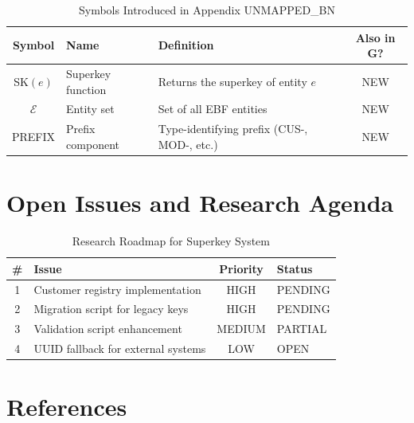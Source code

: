 \begin{table}[htbp]
\centering
\caption{Symbols Introduced in Appendix UNMAPPED_BN}
\label{tab:superkey-symbols}
\renewcommand{\arraystretch}{1.3}
\begin{tabular}{@{}clp{6cm}c@{}}
\toprule
\textbf{Symbol} & \textbf{Name} & \textbf{Definition} & \textbf{Also in G?} \\
\midrule
SK$(e)$ & Superkey function & Returns the superkey of entity $e$ & NEW \\
$\mathcal{E}$ & Entity set & Set of all EBF entities & NEW \\
PREFIX & Prefix component & Type-identifying prefix (CUS-, MOD-, etc.) & NEW \\
\bottomrule
\end{tabular}
\end{table}


\section{Open Issues and Research Agenda}
\label{sec:superkey-open}

\begin{table}[htbp]
\centering
\caption{Research Roadmap for Superkey System}
\label{tab:superkey-roadmap}
\renewcommand{\arraystretch}{1.3}
\begin{tabular}{@{}clcl@{}}
\toprule
\textbf{\#} & \textbf{Issue} & \textbf{Priority} & \textbf{Status} \\
\midrule
1 & Customer registry implementation & HIGH & PENDING \\
2 & Migration script for legacy keys & HIGH & PENDING \\
3 & Validation script enhancement & MEDIUM & PARTIAL \\
4 & UUID fallback for external systems & LOW & OPEN \\
\bottomrule
\end{tabular}
\end{table}


\section{References}
\label{sec:superkey-references}

